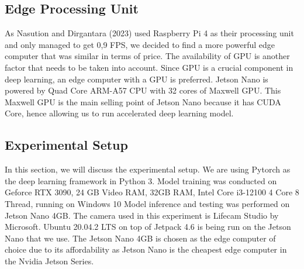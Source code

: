 \documentclass[conference]{IEEEtran}
\begin{document}
\subsection{Edge Processing Unit}
As Nasution and Dirgantara (2023) used Raspberry Pi 4 as their processing unit and only managed to get 0,9 FPS, we decided to find a more powerful edge computer that was similar in terms of price.
The availability of GPU is another factor that needs to be taken into account. Since GPU is a crucial component in deep learning, an edge computer with a GPU is preferred.
Jetson Nano is powered by Quad Core ARM-A57 CPU with 32 cores of Maxwell GPU. This Maxwell GPU is the main selling point of Jetson Nano because it has CUDA Core, hence allowing us to run accelerated deep learning model.

\subsection{Experimental Setup}
In this section, we will discuss  the experimental setup. We are using Pytorch as the deep learning framework in Python  3.
Model training was conducted on Geforce RTX 3090, 24 GB Video RAM, 32GB RAM, Intel Core i3-12100 4 Core 8 Thread, running on Windows 10
Model inference and testing was performed on Jetson Nano 4GB. The camera used in this experiment is Lifecam Studio by Microsoft.
Ubuntu 20.04.2 LTS on top of Jetpack 4.6 is being run on the Jetson Nano that we use. The Jetson Nano 4GB is chosen as the edge computer of choice due to its affordability as Jetson Nano is the cheapest edge computer in the Nvidia Jetson Series.
\end{document}
